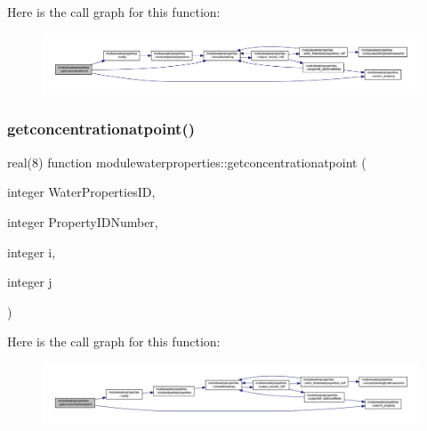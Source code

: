 Here is the call graph for this function\+:\nopagebreak
\begin{figure}[H]
\begin{center}
\leavevmode
\includegraphics[width=350pt]{namespacemodulewaterproperties_a07e476dc922e05a1476e0df171c1bd25_cgraph}
\end{center}
\end{figure}
\mbox{\label{namespacemodulewaterproperties_ad43cb3a8e776adc92efab9346992a581}} 
\subsubsection{\texorpdfstring{getconcentrationatpoint()}{getconcentrationatpoint()}}
{\footnotesize\ttfamily real(8) function modulewaterproperties\+::getconcentrationatpoint (\begin{DoxyParamCaption}\item[{integer}]{Water\+Properties\+ID,  }\item[{integer}]{Property\+I\+D\+Number,  }\item[{integer}]{i,  }\item[{integer}]{j }\end{DoxyParamCaption})\hspace{0.3cm}{\ttfamily [private]}}

Here is the call graph for this function\+:\nopagebreak
\begin{figure}[H]
\begin{center}
\leavevmode
\includegraphics[width=350pt]{namespacemodulewaterproperties_ad43cb3a8e776adc92efab9346992a581_cgraph}
\end{center}
\end{figure}
\mbox{\label{namespacemodulewaterproperties_a5d3bf3d9b122b9eee78afc56a4047507}} 
